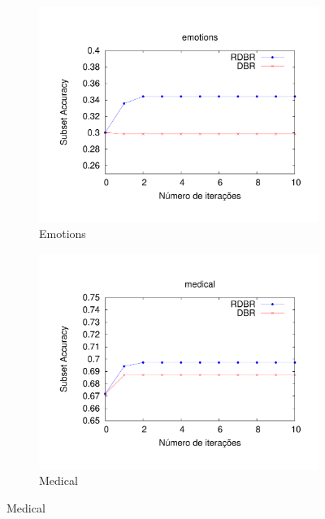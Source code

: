 \begin{figure}
\centering
\begin{subfigure}{.5\textwidth}
  \centering
  \includegraphics[angle=-90, width=1\linewidth]{plots/emotions.pdf}
  \caption{Emotions}
  \label{fig:subemotions}
\end{subfigure}%
\begin{subfigure}{.5\textwidth}
  \centering
  \includegraphics[angle=-90, width=1\linewidth]{plots/medical.pdf}
  \caption{Medical}
  \label{fig:submedical}
\end{subfigure}


\end{figure}
